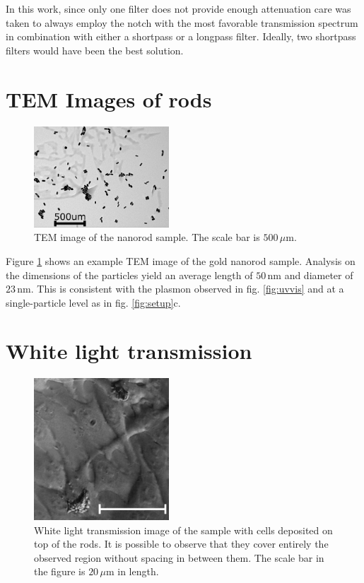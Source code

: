 \documentclass[journal=nalefd,manuscript=letter]{achemso}
\newcommand{\nm}{\ensuremath{\,\textrm{nm}}}
\newcommand{\um}{\ensuremath{\,\mu\textrm{m}}}
\begin{document}
In this work, since only one filter does not provide enough attenuation care was
taken to always employ the notch with the most favorable transmission spectrum
in combination with either a shortpass or a longpass filter. Ideally, two
shortpass filters would have been the best solution.
 
 \section{TEM Images of rods}
 
\begin{figure}[htp]
 \centering
 \includegraphics[width=0.45\textwidth]{Figures/Supplementary/04_TEM/tem.png}
 \caption{TEM image of the nanorod sample. The scale bar is $500\um$. }
 \label{fig:TEM}
 \end{figure}
 
Figure \ref{fig:TEM} shows an example TEM image of the gold nanorod sample.
Analysis on the dimensions of the particles yield an average length of $50\nm$
and diameter of $23\nm$. This is consistent with the plasmon observed in fig.
\ref{fig:uvvis} and at a single-particle level as in fig. \ref{fig:setup}c.

\section{White light transmission}
\begin{figure}[htp]
\centering
	\includegraphics[width=0.45\textwidth]{Figures/Supplementary/05_White_Light/white_light_scale.png}
	\caption{White light transmission image of the sample with cells deposited on
	top of the rods. It is possible to observe that they cover entirely the
	observed region without spacing in between them. The scale bar in the figure
	is $20\um$ in length.}
	\label{fig:white-light}
\end{figure}
\end{document}
